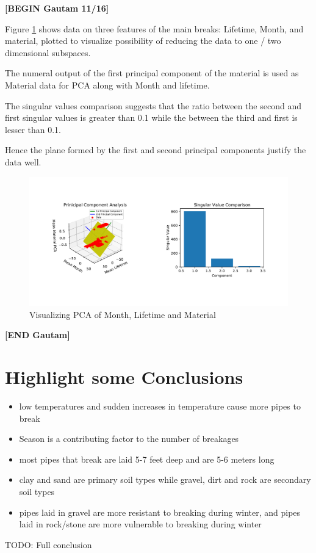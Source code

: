 \documentclass[twocolumn]{article}
\begin{document}
\textbf{[BEGIN Gautam 11/16]}

Figure \ref{fig:pca} shows data on three features of the main breaks: Lifetime, Month, and material, plotted to visualize possibility of reducing the data to one / two dimensional subspaces.

The numeral output of the first principal component of the material is used as Material data for PCA along with Month and lifetime.

The singular values comparison suggests that the ratio between the second and first singular values is greater than 0.1 while the between the third and first is lesser than 0.1.

Hence the plane formed by the first and second principal components justify the data well.



\begin{figure}
\centering
    \includegraphics[width=\textwidth]{Gautam/analysis.pdf}
    \caption{Visualizing PCA of Month, Lifetime and Material}
    \label{fig:pca}
\end{figure}

\textbf{[END Gautam]}

\section{Highlight some Conclusions}
\begin{itemize}
\item low temperatures and sudden increases in temperature cause more pipes to break
\item Season is a contributing factor to the number of breakages
\item most pipes that break are laid 5-7 feet deep and are 5-6 meters long 
\item clay and sand are primary soil types while gravel, dirt and rock are secondary soil types
\item pipes laid in gravel are more resistant to breaking during winter, and pipes laid in rock/stone are more vulnerable to breaking during winter
\end{itemize}

TODO: Full conclusion 
\end{document}
